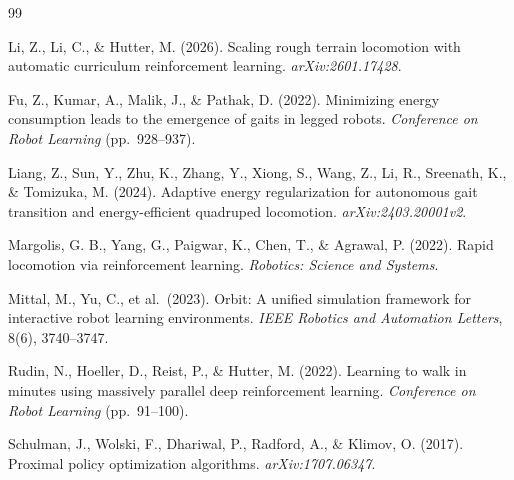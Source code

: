 \documentclass[a4paper,11pt]{article}
\begin{document}
    \begin{thebibliography}{99}

    Li, Z., Li, C., \& Hutter, M. (2026).
    Scaling rough terrain locomotion with automatic curriculum reinforcement learning.
    \textit{arXiv:2601.17428}.

    Fu, Z., Kumar, A., Malik, J., \& Pathak, D. (2022).
    Minimizing energy consumption leads to the emergence of gaits in legged robots.
    \textit{Conference on Robot Learning} (pp.\ 928--937).

    Liang, Z., Sun, Y., Zhu, K., Zhang, Y., Xiong, S., Wang, Z., Li, R., Sreenath, K., \& Tomizuka, M. (2024).
    Adaptive energy regularization for autonomous gait transition and energy-efficient quadruped locomotion.
    \textit{arXiv:2403.20001v2}.

    Margolis, G. B., Yang, G., Paigwar, K., Chen, T., \& Agrawal, P. (2022).
    Rapid locomotion via reinforcement learning.
    \textit{Robotics: Science and Systems}.

    Mittal, M., Yu, C., et al.\ (2023).
    Orbit: A unified simulation framework for interactive robot learning environments.
    \textit{IEEE Robotics and Automation Letters}, 8(6), 3740--3747.

    Rudin, N., Hoeller, D., Reist, P., \& Hutter, M. (2022).
    Learning to walk in minutes using massively parallel deep reinforcement learning.
    \textit{Conference on Robot Learning} (pp.\ 91--100).

    Schulman, J., Wolski, F., Dhariwal, P., Radford, A., \& Klimov, O. (2017).
    Proximal policy optimization algorithms.
    \textit{arXiv:1707.06347}.

    \end{thebibliography}

    
\end{document}

